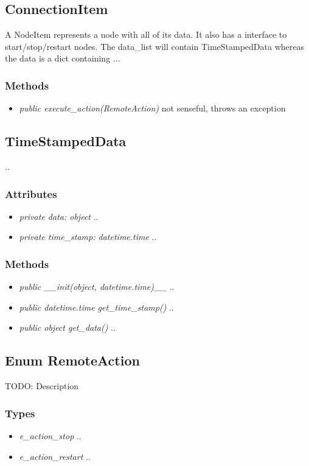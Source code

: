 \subsection{ConnectionItem}
 A NodeItem represents a node with all of its data. It also has a interface to start/stop/restart nodes.
 The data\_list will contain TimeStampedData whereas the data is a dict containing ...
\subsubsection{Methods}
\begin{itemize}
  \item \textit{public execute\_action(RemoteAction)} not senseful, throws an exception
\end{itemize}

\subsection{TimeStampedData}
..
\subsubsection{Attributes}
\begin{itemize}
  \item \textit{private data: object}
  ..
  \item \textit{private time\_stamp: datetime.time}
  ..
\end{itemize}
\subsubsection{Methods}
\begin{itemize}
  \item \textit{public \_\_init(object, datetime.time)\_\_}
  ..
  \item \textit{public datetime.time get\_time\_stamp()}
  ..
  \item \textit{public object get\_data()}
  ..
\end{itemize}

\subsection{Enum RemoteAction}
TODO: Description
\subsubsection{Types}
\begin{itemize}
	\item \textit{e\_action\_stop}
	..
	\item \textit{e\_action\_restart}
	..
\end{itemize}

